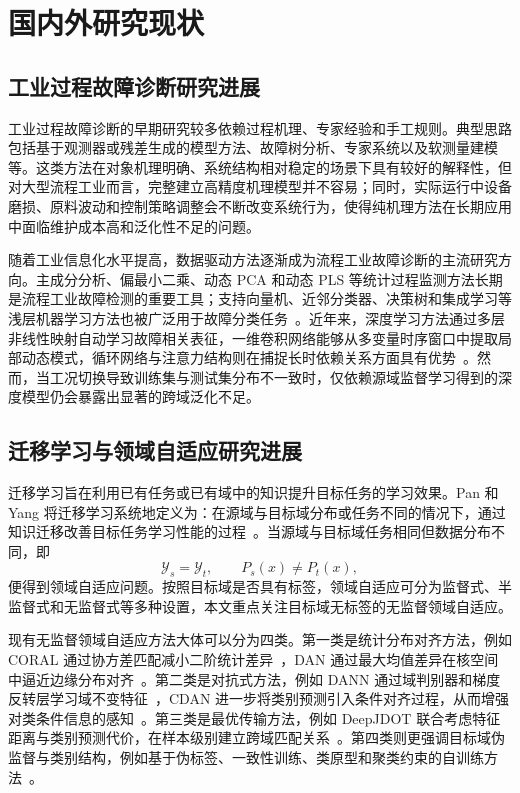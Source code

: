\section{国内外研究现状}
\subsection{工业过程故障诊断研究进展}
工业过程故障诊断的早期研究较多依赖过程机理、专家经验和手工规则。典型思路包括基于观测器或残差生成的模型方法、故障树分析、专家系统以及软测量建模等。这类方法在对象机理明确、系统结构相对稳定的场景下具有较好的解释性，但对大型流程工业而言，完整建立高精度机理模型并不容易；同时，实际运行中设备磨损、原料波动和控制策略调整会不断改变系统行为，使得纯机理方法在长期应用中面临维护成本高和泛化性不足的问题。

随着工业信息化水平提高，数据驱动方法逐渐成为流程工业故障诊断的主流研究方向。主成分分析、偏最小二乘、动态 PCA 和动态 PLS 等统计过程监测方法长期是流程工业故障检测的重要工具；支持向量机、近邻分类器、决策树和集成学习等浅层机器学习方法也被广泛用于故障分类任务~\cite{qin2012survey,ge2017review}。近年来，深度学习方法通过多层非线性映射自动学习故障相关表征，一维卷积网络能够从多变量时序窗口中提取局部动态模式，循环网络与注意力结构则在捕捉长时依赖关系方面具有优势~\cite{wu2018dcnn,taqvi2021review}。然而，当工况切换导致训练集与测试集分布不一致时，仅依赖源域监督学习得到的深度模型仍会暴露出显著的跨域泛化不足。

\subsection{迁移学习与领域自适应研究进展}
迁移学习旨在利用已有任务或已有域中的知识提升目标任务的学习效果。Pan 和 Yang 将迁移学习系统地定义为：在源域与目标域分布或任务不同的情况下，通过知识迁移改善目标任务学习性能的过程~\cite{pan2009survey}。当源域与目标域任务相同但数据分布不同，即
\begin{equation}
\mathcal{Y}_s=\mathcal{Y}_t,\qquad P_s(x)\neq P_t(x),
\end{equation}
便得到领域自适应问题。按照目标域是否具有标签，领域自适应可分为监督式、半监督式和无监督式等多种设置，本文重点关注目标域无标签的无监督领域自适应。

现有无监督领域自适应方法大体可以分为四类。第一类是统计分布对齐方法，例如 CORAL 通过协方差匹配减小二阶统计差异~\cite{sun2016deep}，DAN 通过最大均值差异在核空间中逼近边缘分布对齐~\cite{long2015dan}。第二类是对抗式方法，例如 DANN 通过域判别器和梯度反转层学习域不变特征~\cite{ganin2016dann}，CDAN 进一步将类别预测引入条件对齐过程，从而增强对类条件信息的感知~\cite{long2018conditional}。第三类是最优传输方法，例如 DeepJDOT 联合考虑特征距离与类别预测代价，在样本级别建立跨域匹配关系~\cite{damodaran2018deepjdot}。第四类则更强调目标域伪监督与类别结构，例如基于伪标签、一致性训练、类原型和聚类约束的自训练方法~\cite{lee2013pseudolabel,tarvainen2017meanteacher,tanwisuth2021prototype}。

